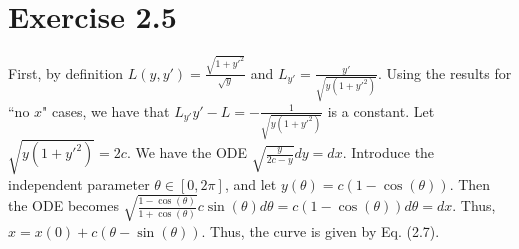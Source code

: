 \documentclass[11pt]{report}
\begin{document}
\section*{Exercise 2.5}
First, by definition $L(y,y') = \frac{\sqrt{1+y'^2}}{\sqrt{y}}$ and $L_{y'} = \frac{y'}{\sqrt{y(1+y'^2)}}$. Using the results for ``no $x$" cases, we have that $L_{y'}y' - L = -\frac{1}{\sqrt{y(1+y'^2)}}$ is a constant. Let $\sqrt{y(1+y'^2)} = 2c$. We have the ODE $\sqrt{\frac{y}{2c-y}}dy = dx$. Introduce the independent parameter $\theta \in [0, 2\pi]$, and let $y(\theta) = c(1-\cos(\theta))$. Then the ODE becomes $\sqrt{\frac{1-\cos(\theta)}{1+\cos(\theta)}}c\sin(\theta)d\theta = c(1-\cos(\theta))d\theta = dx$. Thus, $x = x(0) + c(\theta - \sin(\theta))$. Thus, the curve is given by Eq. (2.7).

\end{document}
